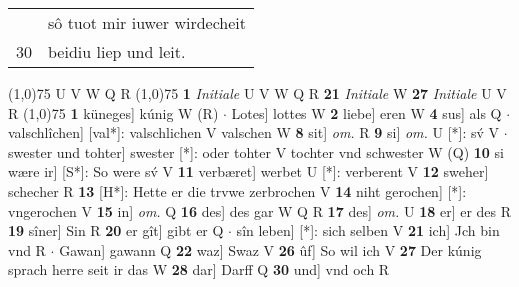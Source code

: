 \documentclass[8pt,a4paper,notitlepage]{article}
\begin{document}
\begin{table}[ht]
\begin{minipage}[t]{0.5\linewidth}
\begin{tabular}{rl}
 & sô tuot mir iuwer wirdecheit\\ 
30 & beidiu liep und leit.\\ 
\end{tabular}
\scriptsize
\line(1,0){75} \newline
U V W Q R \newline
\line(1,0){75} \newline
\textbf{1} \textit{Initiale} U V W Q R  \textbf{21} \textit{Initiale} W  \textbf{27} \textit{Initiale} U V R  \newline
\line(1,0){75} \newline
\textbf{1} küneges] kúnig W (R)  $\cdot$ Lotes] lottes W \textbf{2} liebe] eren W \textbf{4} sus] als Q  $\cdot$ valschlîchen] [val*]: valschlichen V valschen W \textbf{8} sit] \textit{om.} R \textbf{9} si] \textit{om.} U [*]: sv́ V  $\cdot$ swester und tohter] swester [*]: oder tohter V tochter vnd schwester W (Q) \textbf{10} si wære ir] [S*]: So were sv́ V \textbf{11} verbæret] werbet U [*]: verberent V \textbf{12} sweher] schecher R \textbf{13} [H*]: Hette er die trvwe zerbrochen V \textbf{14} niht gerochen] [*]: vngerochen V \textbf{15} in] \textit{om.} Q \textbf{16} des] des gar W Q R \textbf{17} des] \textit{om.} U \textbf{18} er] er des R \textbf{19} sîner] Sin R \textbf{20} er gît] gibt er Q  $\cdot$ sîn leben] [*]: sich selben V \textbf{21} ich] Jch bin vnd R  $\cdot$ Gawan] gawann Q \textbf{22} waz] Swaz V \textbf{26} ûf] So wil ich V \textbf{27} Der kúnig sprach herre seit ir das W \textbf{28} dar] Darff Q \textbf{30} und] vnd och R \newline
\end{minipage}
\end{table}
\end{document}
